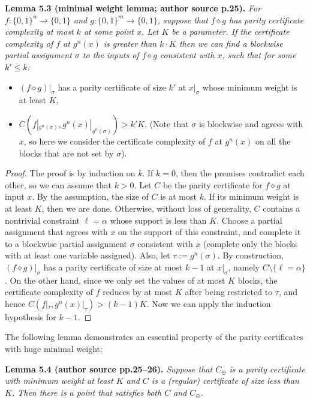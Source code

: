 \documentclass[10pt,a4paper]{article}
\newcommand{\bits}{\{0,1\}}
\newcommand{\comp}{\diamond}
\newenvironment{originalresult}[1]{\par\medskip\noindent\textbf{#1.}\itshape}{\par\medskip}
\begin{document}
\begin{originalresult}{Lemma 5.3 (minimal weight lemma; author source p.25)}
For $f:\bits^n\to\bits$ and $g:\bits^m\to\bits$, suppose that $f\comp g$ has parity certificate complexity at most $k$ at some point $x$. Let $K$ be a parameter. If the certificate complexity of $f$ at $g^n(x)$ is greater than $k\cdot K$ then we can find a blockwise partial assignment $\sigma$ to the inputs of $f\comp g$ consistent with $x$, such that for some $k'\le k$:
\begin{itemize}
\item $(f\comp g)|_\sigma$ has a parity certificate of size $k'$ at $x|_\sigma$ whose minimum weight is at least $K$,
\item $C(f|_{g^n(\sigma)},g^n(x)|_{g^n(\sigma)})>k'K$. (Note that $\sigma$ is blockwise and agrees with $x$, so here we consider the certificate complexity of $f$ at $g^n(x)$ on all the blocks that are not set by $\sigma$).
\end{itemize}
\end{originalresult}
\begin{proof}
The proof is by induction on $k$. If $k=0$, then the premises contradict each other, so we can assume that $k>0$.
Let $C$ be the parity certificate for $f\comp g$ at input $x$. By the assumption, the size of $C$ is at most $k$. If its minimum weight is at least $K$, then we are done. Otherwise, without loss of generality, $C$ contains a nontrivial constraint $\ell=\alpha$ whose support is less than $K$. Choose a partial assignment that agrees with $x$ on the support of this constraint, and complete it to a blockwise partial assignment $\sigma$ consistent with $x$ (complete only the blocks with at least one variable assigned). Also, let $\tau:=g^n(\sigma)$.
By construction, $(f\comp g)|_\sigma$ has a parity certificate of size at most $k-1$ at $x|_\sigma$, namely $C\setminus\{\ell=\alpha\}$. On the other hand, since we only set the values of at most $K$ blocks, the certificate complexity of $f$ reduces by at most $K$ after being restricted to $\tau$, and hence $C(f|_\tau,g^n(x)|_\tau)>(k-1)K$. Now we can apply the induction hypothesis for $k-1$.
\end{proof}
The following lemma demonstrates an essential property of the parity certificates with huge minimal weight:
\begin{originalresult}{Lemma 5.4 (author source pp.25--26)}
Suppose that $C_\oplus$ is a parity certificate with minimum weight at least $K$ and $C$ is a (regular) certificate of size less than $K$. Then there is a point that satisfies both $C$ and $C_\oplus$.
\end{originalresult}
\end{document}
